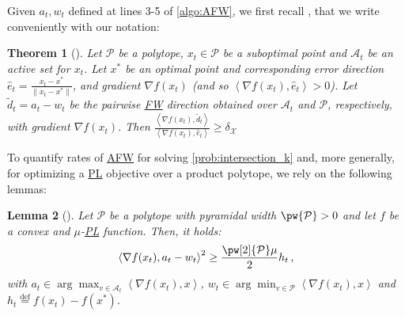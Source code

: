 \documentclass{article}
\newcommand\linktoproof[1]{{\normalfont[{\hyperlink{proof:#1}{$\downarrow$}}]}}
\newcommand{\mP}{\mathcal{P}}
\newcommand{\mA}{\mathcal{A}}
\newcommand{\mX}{\mathcal{X}}
\newcommand{\innp}[1]{\left\langle #1 \right\rangle}
\newcommand{\defi}{\stackrel{\mathrm{\scriptscriptstyle def}}{=}}
\newtheorem{theorem}{Theorem}[section]
\newtheorem{lemma}[theorem]{Lemma}
\newcommand{\gabrev}[1]{\textcolor{black}{#1}}
\newcommand\newlink[2]{\hyperlink{#1}{\normalcolor #2}}
\newcommand{\PL}{\newlink{def:acronym_polyak_lojasiewicz}{PL}}
\newcommand{\FW}{\newlink{def:acronym_frank_wolfe}{FW}}
\newcommand{\AFW}{\newlink{def:acronym_away_frank_wolfe}{AFW}}
\begin{document}
Given $a_t, w_t$ defined at lines 3-5 of \cref{algo:AFW}, we first recall {\cite[Theorem 3]{LJ15}}, that we write conveniently with our notation:
%
\begin{theorem}[{\cite[Theorem 3]{LJ15}}]\label{thm:scaling_ineq}
Let $\mP$ be a polytope, $x_t \in \mP$ be a suboptimal point and $\mA_t$ be an active set for $x_t$. Let $x^\ast$ be an optimal point and corresponding error direction $\hat{e}_t =  \frac{x_t - x^\ast}{\|x_t - x^\ast\|}$, and gradient $\nabla f(x_t)$ (and so $\innp{\nabla f(x_t), \hat{e}_t} > 0$). Let $\tilde{d}_t = a_t - w_t$ be the pairwise \FW{} direction obtained over $\mA_t$ and $\mP$, respectively, with gradient $\nabla f(x_t)$. Then
$\frac{\innp{\nabla f(x_t), \tilde{d}_t}}{\innp{\nabla f(x_t), \hat{e}_t}} \ge \delta_\mX$
\label{thm:pyrwidth}
\end{theorem}
%
To quantify rates of \AFW{} for solving \cref{prob:intersection_k} and, more generally, for optimizing a \PL{} objective over a product polytope, we rely on the following lemmas:
%
\begin{lemma}[\gabrev{{\cite[Lemma 3.32]{BCC+23}}}]
\label{lemma:geom_pl}%
Let $\mP$ be a polytope with pyramidal width $\pw{\mP} > 0$ and let $f$ be a convex and $\mu$-\PL{} function. Then, it holds:
\begin{equation}%
%
    \innp{\nabla f(x_t), a_t - w_t}^2 \ge \frac{\pw[2]{\mP} \mu}{2}h_t\,,
\end{equation}
with $a_t \in \arg\max_{v \in \mA_t} \innp{\nabla f(x_t), x}$, $w_t \in \arg\min_{v \in \mP} \innp{\nabla f(x_t), x}$ and $h_t \defi f(x_t) - f(x^\ast)$.
\end{lemma}
%
\end{document}
